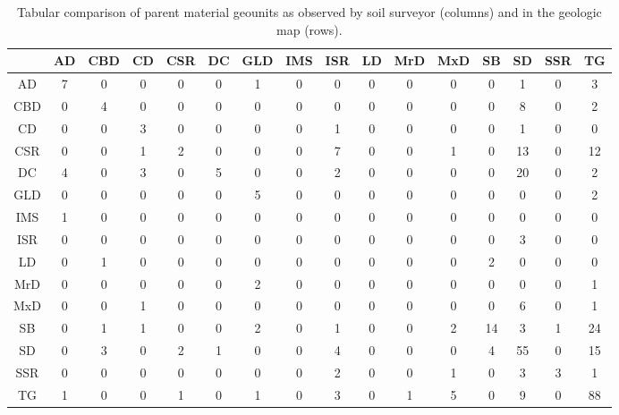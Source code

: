 \documentclass[preprint,12pt,authoryear]{elsarticle}
\begin{document}
\begin{table}[ht]
\centering
\tabcolsep=0.06cm
\begin{tabular}{c|ccccccccccccccc}
 & AD & CBD & CD & CSR & DC & GLD & IMS & ISR & LD & MrD & MxD & SB & SD & SSR & TG \\ 
  \hline
AD &   7 &   0 &   0 &   0 &   0 &   1 &   0 &   0 &   0 &   0 &   0 &   0 &   1 &   0 &   3 \\ 
  CBD &   0 &   4 &   0 &   0 &   0 &   0 &   0 &   0 &   0 &   0 &   0 &   0 &   8 &   0 &   2 \\ 
  CD &   0 &   0 &   3 &   0 &   0 &   0 &   0 &   1 &   0 &   0 &   0 &   0 &   1 &   0 &   0 \\ 
  CSR &   0 &   0 &   1 &   2 &   0 &   0 &   0 &   7 &   0 &   0 &   1 &   0 &  13 &   0 &  12 \\ 
  DC &   4 &   0 &   3 &   0 &   5 &   0 &   0 &   2 &   0 &   0 &   0 &   0 &  20 &   0 &   2 \\ 
  GLD &   0 &   0 &   0 &   0 &   0 &   5 &   0 &   0 &   0 &   0 &   0 &   0 &   0 &   0 &   2 \\ 
  IMS &   1 &   0 &   0 &   0 &   0 &   0 &   0 &   0 &   0 &   0 &   0 &   0 &   0 &   0 &   0 \\ 
  ISR &   0 &   0 &   0 &   0 &   0 &   0 &   0 &   0 &   0 &   0 &   0 &   0 &   3 &   0 &   0 \\ 
  LD &   0 &   1 &   0 &   0 &   0 &   0 &   0 &   0 &   0 &   0 &   0 &   2 &   0 &   0 &   0 \\ 
  MrD &   0 &   0 &   0 &   0 &   0 &   2 &   0 &   0 &   0 &   0 &   0 &   0 &   0 &   0 &   1 \\ 
  MxD &   0 &   0 &   1 &   0 &   0 &   0 &   0 &   0 &   0 &   0 &   0 &   0 &   6 &   0 &   1 \\ 
  SB &   0 &   1 &   1 &   0 &   0 &   2 &   0 &   1 &   0 &   0 &   2 &  14 &   3 &   1 &  24 \\ 
  SD &   0 &   3 &   0 &   2 &   1 &   0 &   0 &   4 &   0 &   0 &   0 &   4 &  55 &   0 &  15 \\ 
  SSR &   0 &   0 &   0 &   0 &   0 &   0 &   0 &   2 &   0 &   0 &   1 &   0 &   3 &   3 &   1 \\ 
  TG &   1 &   0 &   0 &   1 &   0 &   1 &   0 &   3 &   0 &   1 &   5 &   0 &   9 &   0 &  88 \\ 
   \hline
\end{tabular}
\caption{Tabular comparison of parent material geounits as observed by soil surveyor (columns) and in the geologic map (rows).} 
\label{kartiergegenkarte}
\end{table}
\end{document}
